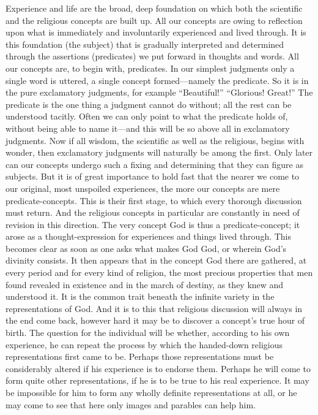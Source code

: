 \documentclass[12pt,a4paper]{article}
\newcommand{\opage}[1]{\marginnote{\footnotesize\textit{[#1]}}}
\begin{document}
Experience and life are the broad, deep foundation on which both the scientific and
the religious concepts are built up. All our concepts are owing to reflection upon what
is immediately and involuntarily experienced and lived through. It is this foundation
(the subject) that is gradually interpreted and determined through the assertions
(predicates) we put forward in thoughts and words. All our concepts are, to begin with,
predicates. In our simplest judgments only a single word is uttered, a single concept
formed---namely the predicate. So it is in the pure exclamatory judgments, for example
``Beautiful!'' ``Glorious! Great!'' The predicate is the one thing a judgment cannot do
without; all the rest can be understood tacitly. Often we can only point to what the
predicate holds of, without being able to name it---and this will be so above all in
exclamatory judgments. Now if all wisdom, the scientific as well as the religious,
begins with wonder, then exclamatory judgments will naturally be among the first. Only
later can our \opage{56}concepts undergo such a fixing and determining that they can figure as
subjects. But it is of great importance to hold fast that the nearer we come to our
original, most unspoiled experiences, the more our concepts are mere predicate-concepts.
This is their first stage, to which every thorough discussion must return. And the
religious concepts in particular are constantly in need of revision in this direction.
The very concept God is thus a predicate-concept; it arose as a thought-expression for
experiences and things lived through. This becomes clear as soon as one asks what makes
God God, or wherein God's divinity consists. It then appears that in the concept God
there are gathered, at every period and for every kind of religion, the most precious
properties that men found revealed in existence and in the march of destiny, as they
knew and understood it. It is the common trait beneath the infinite variety in the
representations of God. And it is to this that religious discussion will always in the
end come back, however hard it may be to discover a concept's true hour of birth. The
question for the individual will be whether, according to his own experience, he can
repeat the process by which the handed-down religious representations first came to be.
Perhaps those representations must be considerably altered if his experience is to
endorse them. Perhaps he will come to form quite other representations, if he is to be
true to his real experience. It may be impossible for him to form any wholly definite
representations at all, or he may come to see that here only images and parables can
help him.
\end{document}
